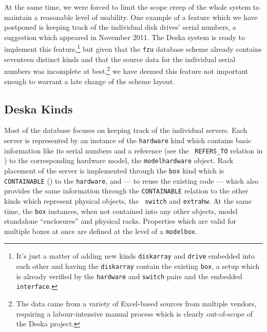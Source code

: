 \documentclass[deska]{subfiles}
\begin{document}
At the same time, we were forced to limit the scope creep of the whole system to maintain a reasonable level of
usability.  One example of a feature which we have postponed is keeping track of the individual disk drives' serial
numbers, a suggestion which appeared in November 2011.  The Deska system is ready to implement this
feature,\footnote{It's just a matter of adding new kinds {\tt diskarray} and {\tt drive} embedded into each other and
having the {\tt diskarray} contain the existing {\tt box}, a setup which is already verified by the {\tt hardware}
and {\tt switch} pairs and the embedded {\tt interface}.} but given that the {\tt fzu} database scheme already contains
seventeen distinct kinds and that the source data for the individual serial numbers was incomplete at best,\footnote{The
data came from a variety of Excel-based sources from multiple vendors, requiring a labour-intensive manual process which
is clearly out-of-scope of the Deska project.} we have deemed this feature not important enough to warrant a late change
of the scheme layout.

\subsection{Deska Kinds}

Most of the database focuses on keeping track of the individual servers.  Each server is represented by an instance of
the {\tt hardware} kind which contains basic information like its serial numbers and a reference (see the {\tt
REFERS\_TO} relation in ) to the corresponding hardware model, the {\tt modelhardware}
object.  Rack placement of the server is implemented through the {\tt box} kind which is {\tt CONTAINABLE}
() to the {\tt hardware}, and --- to reuse the existing code --- which also provides the
same information through the {\tt CONTAINABLE} relation to the other kinds which represent physical objects, the {\tt
switch} and {\tt extrahw}.  At the same time, the {\tt box} instances, when not contained into any other objects, model
standalone ``enclosures'' and physical racks.  Properties which are valid for multiple boxes at once are defined at the
level of a {\tt modelbox}.
\end{document}
